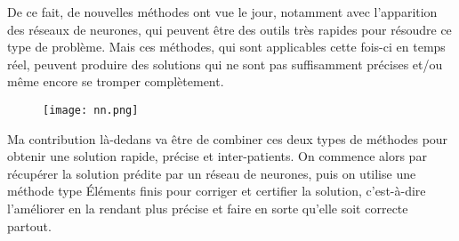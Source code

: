 \begin{minipage}{0.68\linewidth}
	De ce fait, de nouvelles méthodes ont vue le jour, notamment avec l’apparition des réseaux de neurones, qui peuvent être des outils très rapides pour résoudre ce type de problème. Mais ces méthodes, qui sont applicables cette fois-ci en temps réel, peuvent produire des solutions qui ne sont pas suffisamment précises et/ou même encore se tromper complètement. 
\end{minipage}
\begin{minipage}{0.28\linewidth}
	\begin{figure}[H]
		\centering
		\texttt{[image: nn.png]}
	\end{figure}
\end{minipage}

Ma contribution là-dedans va être de combiner ces deux types de méthodes pour obtenir une solution rapide, précise et inter-patients. On commence alors par récupérer la solution prédite par un réseau de neurones, puis on utilise une méthode type Éléments finis pour corriger et certifier la solution, c’est-à-dire l’améliorer en la rendant plus précise et faire en sorte qu'elle soit correcte partout. 